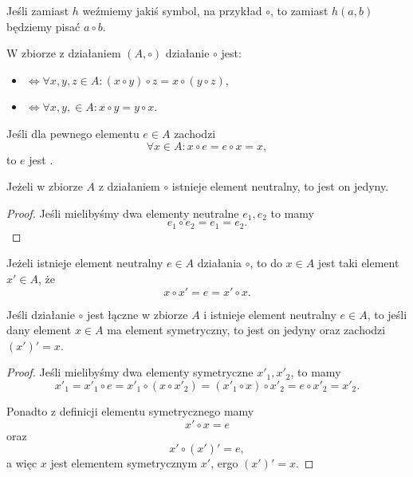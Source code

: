 \documentclass[11pt]{scrartcl}
\begin{document}
    Jeśli zamiast $h$ weźmiemy jakiś symbol, na przykład $\circ$, to zamiast $h(a, b)$ będziemy pisać $a \circ b$.

    \begin{definition}
        W zbiorze z działaniem $(A, \circ)$ działanie $\circ$ jest:
        \begin{itemize}[--]
            \item {} $\iff \forall x, y, z \in A : (x \circ y) \circ z = x \circ (y \circ z)$,
            \item {} $\iff \forall x, y, \in A : x \circ y = y \circ x$.
        \end{itemize}
    \end{definition}

    Jeśli dla pewnego elementu $e \in A$ zachodzi
    $$ \forall x \in A : x \circ e = e \circ x = x, $$
    to $e$ jest .

    \begin{fact}
        Jeżeli w zbiorze $A$ z działaniem $\circ$ istnieje element neutralny, to jest on jedyny.
    \end{fact}
    \begin{proof}
        Jeśli mielibyśmy dwa elementy neutralne $e_1, e_2$ to mamy
        $$ e_1 \circ e_2 = e_1 = e_2. $$
    \end{proof}

    Jeżeli istnieje element neutralny $e \in A$ działania $\circ$, to  do $x \in A$ jest taki element $x' \in A$, że
    $$ x \circ x' = e = x' \circ x. $$

    \begin{lemma}
        Jeśli działanie $\circ$ jest łączne w zbiorze $A$ i istnieje element neutralny $e \in A$, to jeśli dany element $x \in A$ ma element symetryczny, to jest on jedyny oraz zachodzi $(x')' = x$.
    \end{lemma}
    \begin{proof}
        Jeśli mielibyśmy dwa elementy symetryczne $x'_1, x'_2$, to mamy
        $$ x'_1 = x'_1 \circ e = x'_1 \circ (x \circ x'_2) = (x'_1 \circ x) \circ x'_2 = e \circ x'_2 = x'_2. $$

        Ponadto z definicji elementu symetrycznego mamy
        $$ x' \circ x = e $$
        oraz
        $$ x' \circ (x')' = e, $$
        a więc $x$ jest elementem symetrycznym $x'$, ergo $(x')' = x$.
    \end{proof}
\end{document}
